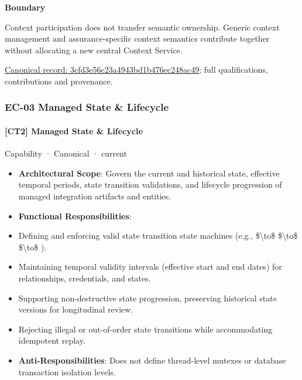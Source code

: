 \textbf{Boundary}



Context participation does not transfer semantic ownership. Generic context management and assurance-specific context semantics contribute together without allocating a new central Context Service.


{\footnotesize \href{../../../../continuum/strategy/capability/3cfd3e56c23a4943bd1b476ec248ac49.md}{Canonical record: 3cfd3e56c23a4943bd1b476ec248ac49}; full qualifications, contributions and provenance.}\par
\subsubsection{EC-03 Managed State \& Lifecycle}

\paragraph{[CT2] Managed State \& Lifecycle}

\label{element:6296abeee5074b9e80f21aea3a297e42}
{\small Capability · Canonical · current}\par

\begin{itemize}


\item \textbf{Architectural Scope}: Govern the current and historical state, effective temporal periods, state transition validations, and lifecycle progression of managed integration artifacts and entities.

\item \textbf{Functional Responsibilities}:

\item Defining and enforcing valid state transition state machines (e.g., \texttt{} \$\textbackslash{}to\$ \texttt{} \$\textbackslash{}to\$ \texttt{} \$\textbackslash{}to\$ \texttt{}).

\item Maintaining temporal validity intervals (effective start and end dates) for relationships, credentials, and states.

\item Supporting non-destructive state progression, preserving historical state versions for longitudinal review.

\item Rejecting illegal or out-of-order state transitions while accommodating idempotent replay.

\item \textbf{Anti-Responsibilities}: Does not define thread-level mutexes or database transaction isolation levels.

\end{itemize}


